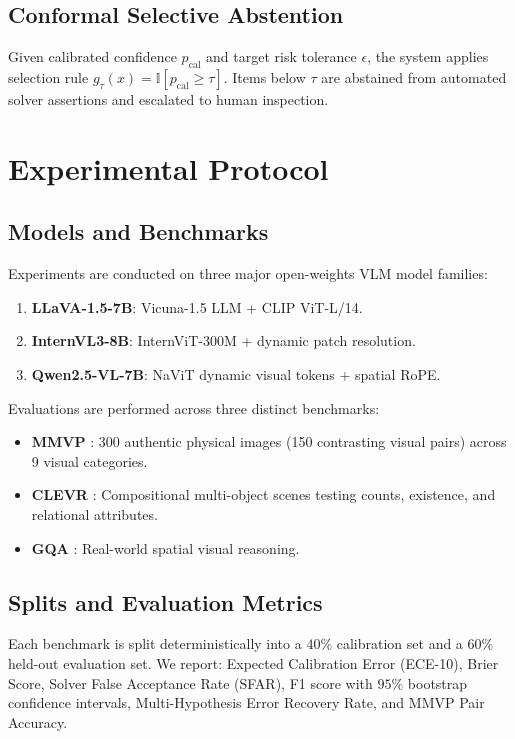 \documentclass[10pt,twocolumn,letterpaper]{article}
\begin{document}
\subsection{Conformal Selective Abstention}
Given calibrated confidence $p_{\text{cal}}$ and target risk tolerance $\epsilon$, the system applies selection rule $g_\tau(x) = \mathbb{I}[p_{\text{cal}} \ge \tau]$. Items below $\tau$ are abstained from automated solver assertions and escalated to human inspection.

\section{Experimental Protocol}

\subsection{Models and Benchmarks}
Experiments are conducted on three major open-weights VLM model families:
\begin{enumerate}
    \item \textbf{LLaVA-1.5-7B}: Vicuna-1.5 LLM + CLIP ViT-L/14.
    \item \textbf{InternVL3-8B}: InternViT-300M + dynamic patch resolution.
    \item \textbf{Qwen2.5-VL-7B}: NaViT dynamic visual tokens + spatial RoPE.
\end{enumerate}

Evaluations are performed across three distinct benchmarks:
\begin{itemize}
    \item \textbf{MMVP} \cite{tong2024eyes}: 300 authentic physical images (150 contrasting visual pairs) across 9 visual categories.
    \item \textbf{CLEVR} \cite{johnson2017clevr}: Compositional multi-object scenes testing counts, existence, and relational attributes.
    \item \textbf{GQA} \cite{hudson2019gqa}: Real-world spatial visual reasoning.
\end{itemize}

\subsection{Splits and Evaluation Metrics}
Each benchmark is split deterministically into a $40\%$ calibration set and a $60\%$ held-out evaluation set. We report: Expected Calibration Error (ECE-10), Brier Score, Solver False Acceptance Rate (SFAR), F1 score with $95\%$ bootstrap confidence intervals, Multi-Hypothesis Error Recovery Rate, and MMVP Pair Accuracy.
\end{document}
